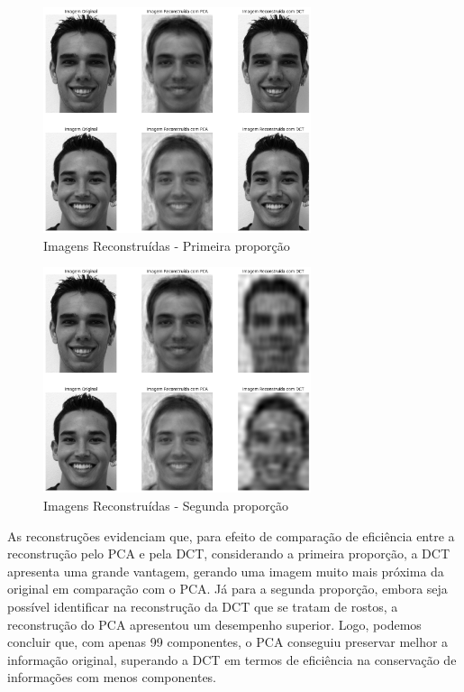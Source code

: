 \documentclass[a4paper, 11pt]{article}
\begin{document}
\begin{figure} [H]
    \centering 
    \includegraphics[width=0.7\textwidth]{imgs/pca_dct_1.png}
    \caption{Imagens Reconstruídas - Primeira proporção}
    \label{fig:pca_dct1} %
\end{figure}

\begin{figure} [H]
    \centering 
    \includegraphics[width=0.7\textwidth]{imgs/pca_dct2.png}
    \caption{Imagens Reconstruídas - Segunda proporção}
    \label{fig:pca_dct2} %
\end{figure}

As reconstruções evidenciam que, para efeito de comparação de eficiência entre a reconstrução pelo PCA e pela DCT, considerando a primeira proporção, a DCT apresenta uma grande vantagem, gerando uma imagem muito mais próxima da original em comparação com o PCA. Já para a segunda proporção, embora seja possível identificar na reconstrução da DCT que se tratam de rostos, a reconstrução do PCA apresentou um desempenho superior. Logo, podemos concluir que, com apenas 99 componentes, o PCA conseguiu preservar melhor a informação original, superando a DCT em termos de eficiência na conservação de informações com menos componentes.
\end{document}
